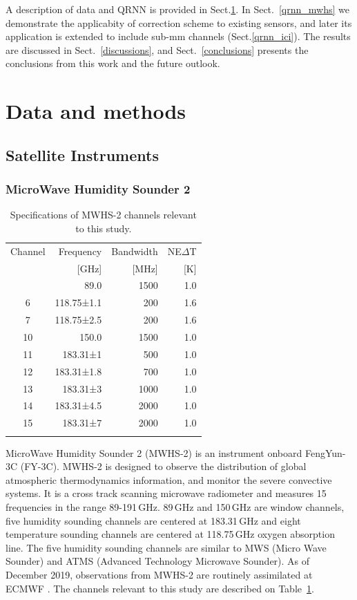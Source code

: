 \documentclass[amt, manuscript]{copernicus}
\begin{document}
A description of data and QRNN is provided in Sect.\ref{data_methods}. In Sect.~\ref{qrnn_mwhs} we demonstrate the applicabity of correction scheme to existing sensors, and later its application is extended to include sub-mm channels (Sect.\ref{qrnn_ici}). The results are discussed in Sect.~\ref{discussions}, and Sect.~\ref{conclusions} presents the conclusions from this work and the future outlook.
\section{Data and methods}
\label{data_methods}
%
\subsection{Satellite Instruments}
%
\subsubsection{ MicroWave Humidity Sounder 2}
%
\begin{table}[t]
	\caption{Specifications of MWHS-2 channels relevant to this study.}
	\label{tab:specifications_MWHS2}	
	\begin{tabular}{crrr}
		\tophline
		Channel & Frequency 	& Bandwidth & NE$\Delta$T \\
		& [GHz]			& [MHz]		& [K]		\\
		\middlehline
		1	&	89.0   		  & 1500			&	1.0	\\
		6	&	118.75±1.1    & \phantom{0}200 	&	1.6\\
		7	&	118.75±2.5    & \phantom{0}200 	&	1.6\\
		10	&	150.0         & 1500 			&	1.0 \\
		11	&	183.31±1      & \phantom{0}500  &	1.0 \\
		12  & 	183.31±1.8    & \phantom{0}700 	&   1.0\\
		13  & 	183.31±3      & 1000    		&	1.0	\\
		14  & 	183.31±4.5    & 2000    		&	1.0\\
		15  & 	183.31±7      & 2000  			&	1.0  \\
		\bottomhline
	\end{tabular}
	\belowtable{} %
\end{table}
MicroWave Humidity Sounder 2 (MWHS-2) is an instrument onboard FengYun-3C (FY-3C). MWHS-2 is designed to observe the distribution of global atmospheric thermodynamics information, and monitor the severe convective systems. It is a cross track scanning microwave radiometer and measures 15 frequencies in the range 89-191\,GHz. 89\,GHz and 150\,GHz are window channels, five humidity sounding channels are centered at 183.31\,GHz and eight temperature sounding channels are centered at 118.75\,GHz oxygen absorption line. The five humidity sounding channels are similar to MWS (Micro Wave Sounder) and ATMS (Advanced Technology Microwave Sounder). As of December 2019, observations from MWHS-2 are routinely assimilated at ECMWF \citep{duncan2020MWHS}. The channels relevant to this study are described on Table~\ref{tab:specifications_MWHS2}. 
\end{document}
